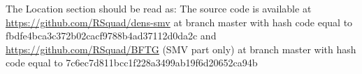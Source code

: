 
The Location section should be read as:
The source code is available at \url{https://github.com/RSquad/dens-smv} at branch master with
hash code equal to fbdfe4bca3c372b02cacf9788b4ad37112d0da2c
and
\url{https://github.com/RSquad/BFTG} (SMV part only) at branch master with hash code equal to
7c6ec7d811bcc1f228a3499ab19f6d20652ca94b



